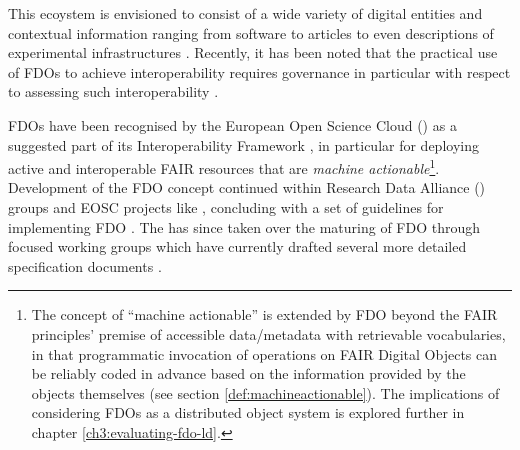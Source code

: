 This ecoystem is envisioned to consist of a wide variety of digital entities and contextual information ranging from software to articles to even descriptions of experimental infrastructures \cite{Azeroual2022PuttingFP}.
Recently, it has been noted that the practical use of FDOs to achieve interoperability requires governance in particular with respect to assessing such interoperability \cite{Wilkinson2023}.

FDOs have been recognised by the European Open Science Cloud () as a suggested part of its Interoperability Framework \cite{eosc-interop-framework}, in particular for deploying active and interoperable FAIR resources that are \emph{machine actionable}\footnote{
  The concept of ``machine actionable'' is extended by FDO beyond the FAIR principles' premise of accessible data/metadata with retrievable vocabularies, in that programmatic invocation of operations on FAIR Digital Objects can be reliably coded in advance based on the information provided by the objects themselves (see section \vref{def:machineactionable}).
  The implications of considering FDOs as a distributed object system is explored further in chapter \vref{ch3:evaluating-fdo-ld}.
}. Development of the FDO concept continued within Research Data Alliance () groups and EOSC projects like , concluding with a set of guidelines for implementing FDO \cite{bonino2019}. The  has since taken over the maturing of FDO through focused working groups which have currently drafted several more detailed specification documents \cite{fdo-Specs}.


